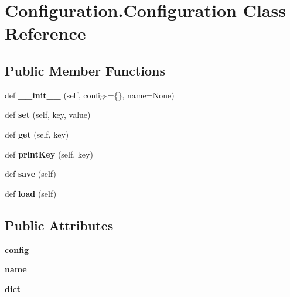 \hypertarget{classConfiguration_1_1Configuration}{}\section{Configuration.\+Configuration Class Reference}
\label{classConfiguration_1_1Configuration}
\subsection*{Public Member Functions}
\begin{DoxyCompactItemize}
\item 
\mbox{\label{classConfiguration_1_1Configuration_a7f47902a81f25a7c51ed7516222a0bc0}} 
def {\bfseries \+\_\+\+\_\+init\+\_\+\+\_\+} (self, configs=\{\}, name=None)
\item 
\mbox{\label{classConfiguration_1_1Configuration_afd4b7fc39ee21e736fbb0fd58cdaebe9}} 
def {\bfseries set} (self, key, value)
\item 
\mbox{\label{classConfiguration_1_1Configuration_a040ac94d7ca32bfad5ef24921f1bddde}} 
def {\bfseries get} (self, key)
\item 
\mbox{\label{classConfiguration_1_1Configuration_a427f73ad80692ff9af62f03688fc2ca7}} 
def {\bfseries print\+Key} (self, key)
\item 
\mbox{\label{classConfiguration_1_1Configuration_abc64650fc1da57092c799d278aaa75f9}} 
def {\bfseries save} (self)
\item 
\mbox{\label{classConfiguration_1_1Configuration_a2801e80f51e98f73868dad1875e198e7}} 
def {\bfseries load} (self)
\end{DoxyCompactItemize}
\subsection*{Public Attributes}
\begin{DoxyCompactItemize}
\item 
\mbox{\label{classConfiguration_1_1Configuration_a50c47a96914750aff43591e8078680f6}} 
{\bfseries config}
\item 
\mbox{\label{classConfiguration_1_1Configuration_ae2aafbd4ab40344b36611f6df6b8ebeb}} 
{\bfseries name}
\item 
\mbox{\label{classConfiguration_1_1Configuration_a7ff9caaff5df5c34ebed87aef84497ed}} 
{\bfseries dict}
\end{DoxyCompactItemize}
